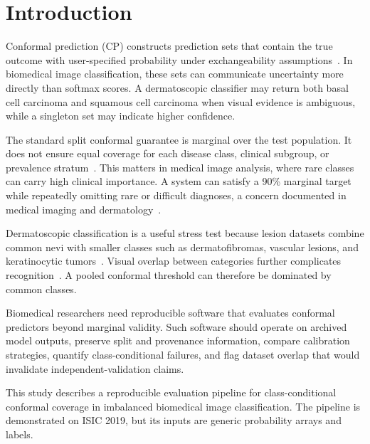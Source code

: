 ﻿\documentclass[preprint,12pt]{elsarticle}
\begin{document}
\section{Introduction}
\label{sec-introduction}

Conformal prediction (CP) constructs prediction sets that contain the true outcome with user-specified probability under exchangeability assumptions~\cite{vovk2005algorithmic,angelopoulos2022gentle}. In biomedical image classification, these sets can communicate uncertainty more directly than softmax scores. A dermatoscopic classifier may return both basal cell carcinoma and squamous cell carcinoma when visual evidence is ambiguous, while a singleton set may indicate higher confidence.

The standard split conformal guarantee is marginal over the test population. It does not ensure equal coverage for each disease class, clinical subgroup, or prevalence stratum~\cite{barber2021limits}. This matters in medical image analysis, where rare classes can carry high clinical importance. A system can satisfy a 90\% marginal target while repeatedly omitting rare or difficult diagnoses, a concern documented in medical imaging and dermatology~\cite{mehrtens2025pitfalls,bhattacharyya2025conformal}.

Dermatoscopic classification is a useful stress test because lesion datasets combine common nevi with smaller classes such as dermatofibromas, vascular lesions, and keratinocytic tumors~\cite{combalia2019bcn20000,tschandl2018ham10000}. Visual overlap between categories further complicates recognition~\cite{celebi2007methodological,groh2021evaluating}. A pooled conformal threshold can therefore be dominated by common classes.

Biomedical researchers need reproducible software that evaluates conformal predictors beyond marginal validity. Such software should operate on archived model outputs, preserve split and provenance information, compare calibration strategies, quantify class-conditional failures, and flag dataset overlap that would invalidate independent-validation claims.

This study describes a reproducible evaluation pipeline for class-conditional conformal coverage in imbalanced biomedical image classification. The pipeline is demonstrated on ISIC 2019, but its inputs are generic probability arrays and labels.
\end{document}

